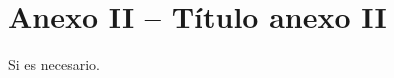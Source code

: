 \vspace*{-2cm}
\section*{Anexo II – Título anexo II}
\label{anexo:anexoII}

Si es necesario.

\lipsum[1-10]